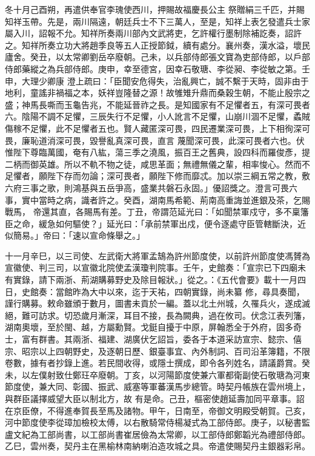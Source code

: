 \begin{pinyinscope}
 冬十月己酉朔，再遣供奉官李瑰使西川，押賜故福慶長公主
 祭贈絹三千匹，并賜知祥玉帶。先是，兩川隔遠，朝廷兵士不下三萬人，至是，知祥上表乞發遣兵士家屬入川，詔報不允。知祥所奏兩川部內文武將吏，乞許權行墨制除補訖奏，詔許之。知祥所奏立功大將趙季良等五人正授節鉞，續有處分。襄州奏，漢水溢，壞民廬舍。癸丑，以太常卿劉岳卒廢朝。己未，以兵部侍郎張文寶為吏部侍郎，以戶部侍郎藥縱之為兵部侍郎。庚申，幸至德宮，因幸石敬瑭、李從昶、李從敏之第。壬申，大理少卿康
 澄上疏曰：「臣聞安危得失，治亂興亡，誠不繫于天時，固非由于地利，童謠非禍福之本，妖祥豈隆替之源！故雊雉升鼎而桑穀生朝，不能止殷宗之盛；神馬長嘶而玉龜告兆，不能延晉祚之長。是知國家有不足懼者五，有深可畏者六。陰陽不調不足懼，三辰失行不足懼，小人訛言不足懼，山崩川涸不足懼，蟊賊傷稼不足懼，此不足懼者五也。賢人藏匿深可畏，四民遷業深可畏，上下相徇深可畏，廉恥道消深可畏，毀譽亂真深可畏，直言
 蔑聞深可畏，此深可畏者六也。伏惟陛下尊臨萬國，奄有八紘，蕩三季之澆風，振百王之舊典，設四科而羅俊彥，提二柄而御英雄。所以不軌不物之徒，咸思革面；無禮無儀之輩，相率悛心。然而不足懼者，願陛下存而勿論；深可畏者，願陛下修而靡忒。加以崇三綱五常之教，敷六府三事之歌，則鴻基與五岳爭高，盛業共磐石永固。」優詔獎之。澄言可畏六事，實中當時之病，識者許之。癸酉，湖南馬希範、荊南高重誨並進銀及茶，乞賜戰馬，
 帝還其直，各賜馬有差。丁丑，帝謂范延光曰：「如聞禁軍戍守，多不稟籓臣之命，緩急如何驅使？」延光曰：「承前禁軍出戍，便令逐處守臣管轄斷決，近似簡易。」帝曰：「速以宣命條舉之。」



 十一月辛巳，以三司使、左武衛大將軍孟鵠為許州節度使，以前許州節度使馮贇為宣徽使、判三司，以宣徽北院使孟漢瓊判院事。壬午，史館奏：「宣宗已下四廟未有實錄，請下兩浙、荊湖購募野史及除目報狀。」從之。：《五代會要》載十一月四日，史館奏：當館昨為大中以來，迄于天祐，四朝實錄，尚未纂
 修，尋具奏聞，謹行購募。敕命雖頒于數月，圖書未貢於一編。蓋以北土州城，久罹兵火，遂成滅絕，難可訪求。切恐歲月漸深，耳目不接，長為闕典，過在攸司。伏念江表列籓，湖南奧壞，至於閩、越，方屬勳賢。戈鋌自擾于中原，屏翰悉全于外府，固多奇士，富有群書。其兩浙、福建、湖廣伏乞詔旨，委各于本道采訪宣宗、懿宗、僖宗、昭宗以上四朝野史，及逐朝日歷、銀臺事宜、內外制詞、百司沿革簿籍，不限卷數，據有者抄錄上進。若民間收得，或隱士撰成，即令各列姓名，請議爵賞。癸未，以左僕射致仕鄭玨卒廢朝。丁亥，以河陽節度使兼六軍都衛副使石敬瑭為河東節度使，兼大同、彰國、振武、威塞等軍蕃漢馬步總管。時契丹帳族在雲州境上，與群臣議擇威望大臣以制北方，故
 有是命。己丑，樞密使趙延壽加同平章事。詔在京臣僚，不得進奉賀長至馬及諸物。甲午，日南至，帝御文明殿受朝賀。己亥，河中節度使李從璋加檢校太傅，以右散騎常侍楊凝式為工部侍郎。庚子，以秘書監盧文紀為工部尚書，以工部尚書崔居儉為太常卿，以工部侍郎鄭韜光為禮部侍郎。乙巳，雲州奏，契丹主在黑榆林南納喇泊造攻城之具。帝遣使賜契丹主銀器彩帛。




\end{pinyinscope}
